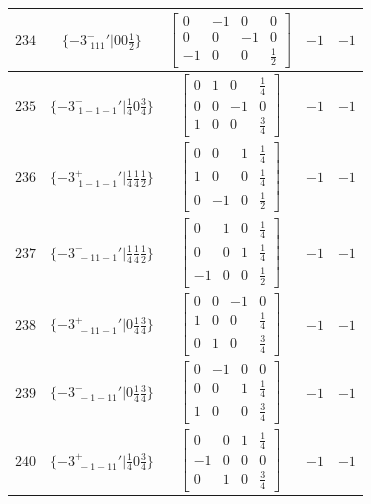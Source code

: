 \documentclass[fleqn,8pt]{jsarticle}
\begin{document}
\begin{longtable}{ccccc}
$ 234 $ & $ \{-3^{-}_{\,\,111}{}'|0 0 \frac{1}{2}\} $ & $ \begin{bmatrix} 0 & -1 & 0 & 0 \\ 0 & 0 & -1 & 0 \\ -1 & 0 & 0 & \frac{1}{2} \end{bmatrix} $ & $ -1 $ & $ -1 $ \\ \hline
$ 235 $ & $ \{-3^{-}_{\,\,1-1-1}{}'|\frac{1}{4} 0 \frac{3}{4}\} $ & $ \begin{bmatrix} 0 & 1 & 0 & \frac{1}{4} \\ 0 & 0 & -1 & 0 \\ 1 & 0 & 0 & \frac{3}{4} \end{bmatrix} $ & $ -1 $ & $ -1 $ \\ \hline
$ 236 $ & $ \{-3^{+}_{\,\,1-1-1}{}'|\frac{1}{4} \frac{1}{4} \frac{1}{2}\} $ & $ \begin{bmatrix} 0 & 0 & 1 & \frac{1}{4} \\ 1 & 0 & 0 & \frac{1}{4} \\ 0 & -1 & 0 & \frac{1}{2} \end{bmatrix} $ & $ -1 $ & $ -1 $ \\ \hline
$ 237 $ & $ \{-3^{-}_{\,\,-11-1}{}'|\frac{1}{4} \frac{1}{4} \frac{1}{2}\} $ & $ \begin{bmatrix} 0 & 1 & 0 & \frac{1}{4} \\ 0 & 0 & 1 & \frac{1}{4} \\ -1 & 0 & 0 & \frac{1}{2} \end{bmatrix} $ & $ -1 $ & $ -1 $ \\ \hline
$ 238 $ & $ \{-3^{+}_{\,\,-11-1}{}'|0 \frac{1}{4} \frac{3}{4}\} $ & $ \begin{bmatrix} 0 & 0 & -1 & 0 \\ 1 & 0 & 0 & \frac{1}{4} \\ 0 & 1 & 0 & \frac{3}{4} \end{bmatrix} $ & $ -1 $ & $ -1 $ \\ \hline
$ 239 $ & $ \{-3^{-}_{\,\,-1-11}{}'|0 \frac{1}{4} \frac{3}{4}\} $ & $ \begin{bmatrix} 0 & -1 & 0 & 0 \\ 0 & 0 & 1 & \frac{1}{4} \\ 1 & 0 & 0 & \frac{3}{4} \end{bmatrix} $ & $ -1 $ & $ -1 $ \\ \hline
$ 240 $ & $ \{-3^{+}_{\,\,-1-11}{}'|\frac{1}{4} 0 \frac{3}{4}\} $ & $ \begin{bmatrix} 0 & 0 & 1 & \frac{1}{4} \\ -1 & 0 & 0 & 0 \\ 0 & 1 & 0 & \frac{3}{4} \end{bmatrix} $ & $ -1 $ & $ -1 $ \\ \hline

\end{longtable}
\end{document}
